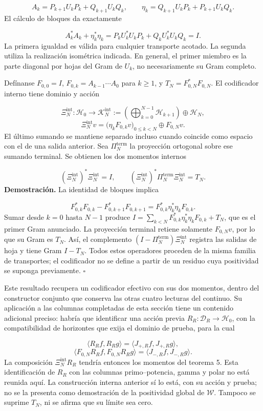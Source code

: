 \[
A_k=P_{k+1}U_kP_k+Q_{k+1}U_kQ_k,
\qquad
\eta_k=Q_{k+1}U_kP_k+P_{k+1}U_kQ_k.
\]
El cálculo de bloques da exactamente

\[
A_k^*A_k+\eta_k^*\eta_k
=P_kU_k^*U_kP_k+Q_kU_k^*U_kQ_k=I.
\]
La primera igualdad es válida para cualquier transporte acotado. La segunda utiliza la realización isométrica indicada. En general, el primer miembro es la parte diagonal por hojas del Gram de \(U_k\), no necesariamente su Gram completo.

Defínanse \(F_{0,0}=I\), \(F_{0,k}=A_{k-1}\cdots A_0\) para \(k\geq1\), y \(T_N=F_{0,N}^*F_{0,N}\). El codificador interno tiene dominio y acción

\[
\Xi_N^{\mathrm{int}}:\mathscr H_0\longrightarrow
\mathscr K_N^{\mathrm{int}}
:=\left(\bigoplus_{k=0}^{N-1}\mathscr H_{k+1}\right)\oplus\mathscr H_N,
\]
\[
\Xi_N^{\mathrm{int}}v
=\bigl(\eta_kF_{0,k}v\bigr)_{0\leq k<N}\oplus F_{0,N}v.
\]
El último sumando se mantiene separado incluso cuando coincide como espacio con el de una salida anterior. Sea \(\Pi_N^{\mathrm{term}}\) la proyección ortogonal sobre ese sumando terminal. Se obtienen los dos momentos internos

\[
(\Xi_N^{\mathrm{int}})^*\Xi_N^{\mathrm{int}}=I,
\qquad
(\Xi_N^{\mathrm{int}})^*\Pi_N^{\mathrm{term}}\Xi_N^{\mathrm{int}}=T_N.
\]
\textbf{Demostración.} La identidad de bloques implica

\[
F_{0,k}^*F_{0,k}-F_{0,k+1}^*F_{0,k+1}
=F_{0,k}^*\eta_k^*\eta_kF_{0,k}.
\]
Sumar desde \(k=0\) hasta \(N-1\) produce \(I=\sum_{k<N}F_{0,k}^*\eta_k^*\eta_kF_{0,k}+T_N\), que es el primer Gram anunciado. La proyección terminal retiene solamente \(F_{0,N}v\), por lo que su Gram es \(T_N\). Así, el complemento \((I-\Pi_N^{\mathrm{term}})\Xi_N^{\mathrm{int}}\) registra las salidas de hoja y tiene Gram \(I-T_N\). Todos estos operadores proceden de la misma familia de transportes; el codificador no se define a partir de un residuo cuya positividad se suponga previamente. \hfill\(\square\)

Este resultado recupera un codificador efectivo con sus dos momentos, dentro del constructor conjunto que conserva las otras cuatro lecturas del continuo. Su aplicación a las columnas completadas de esta sección tiene un contenido adicional preciso: habría que identificar una acción previa \(R_R:\mathcal D_R\to\mathscr H_0\), con la compatibilidad de horizontes que exija el dominio de prueba, para la cual

\[
\langle R_Rf,R_Rg\rangle
=\langle J_{+,R}f,J_{+,R}g\rangle,
\]
\[
\langle F_{0,N}R_Rf,F_{0,N}R_Rg\rangle
=\langle J_{-,R}f,J_{-,R}g\rangle.
\]
La composición \(\Xi_N^{\mathrm{int}}R_R\) tendría entonces los momentos del teorema 5. Esta identificación de \(R_R\) con las columnas primo–potencia, gamma y polar no está reunida aquí. La construcción interna anterior sí lo está, con su acción y prueba; no se la presenta como demostración de la positividad global de \(\mathscr W\). Tampoco se suprime \(T_N\), ni se afirma que su límite sea cero.

